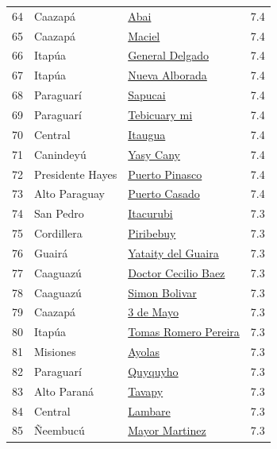 {\begin{longtable}[]{@{}llll@{}}
64 & Caazapá & \hyperref[dist:06_Caazapa:Abai]{Abai} & 7.4 \\
65 & Caazapá & \hyperref[dist:06_Caazapa:Maciel]{Maciel} & 7.4 \\
66 & Itapúa & \hyperref[dist:07_Itapua:General_Delgado]{General Delgado} & 7.4 \\
67 & Itapúa & \hyperref[dist:07_Itapua:Nueva_Alborada]{Nueva Alborada} & 7.4 \\
68 & Paraguarí & \hyperref[dist:09_Paraguari:Sapucai]{Sapucai} & 7.4 \\
69 & Paraguarí & \hyperref[dist:09_Paraguari:Tebicuary_mi]{Tebicuary mi} & 7.4 \\
70 & Central & \hyperref[dist:11_Central:Itaugua]{Itaugua} & 7.4 \\
71 & Canindeyú & \hyperref[dist:14_Canindeyu:Yasy_Cany]{Yasy Cany} & 7.4 \\
72 & Presidente Hayes & \hyperref[dist:15_Presidente_Hayes:Puerto_Pinasco]{Puerto Pinasco} & 7.4 \\
73 & Alto Paraguay & \hyperref[dist:17_Alto_Paraguay:Puerto_Casado]{Puerto Casado} & 7.4 \\
74 & San Pedro & \hyperref[dist:02_San_Pedro:Itacurubi]{Itacurubi} & 7.3 \\
75 & Cordillera & \hyperref[dist:03_Cordillera:Piribebuy]{Piribebuy} & 7.3 \\
76 & Guairá & \hyperref[dist:04_Guaira:Yataity_del_Guaira]{Yataity del Guaira} & 7.3 \\
77 & Caaguazú & \hyperref[dist:05_Caaguazu:Doctor_Cecilio_Baez]{Doctor Cecilio Baez} & 7.3 \\
78 & Caaguazú & \hyperref[dist:05_Caaguazu:Simon_Bolivar]{Simon Bolivar} & 7.3 \\
79 & Caazapá & \hyperref[dist:06_Caazapa:3_de_Mayo]{3 de Mayo} & 7.3 \\
80 & Itapúa & \hyperref[dist:07_Itapua:Tomas_Romero_Pereira]{Tomas Romero Pereira} & 7.3 \\
81 & Misiones & \hyperref[dist:08_Misiones:Ayolas]{Ayolas} & 7.3 \\
82 & Paraguarí & \hyperref[dist:09_Paraguari:Quyquyho]{Quyquyho} & 7.3 \\
83 & Alto Paraná & \hyperref[dist:10_Alto_Parana:Tavapy]{Tavapy} & 7.3 \\
84 & Central & \hyperref[dist:11_Central:Lambare]{Lambare} & 7.3 \\
85 & Ñeembucú & \hyperref[dist:12_Neembucu:Mayor_Martinez]{Mayor Martinez} & 7.3 \\

\end{longtable}}
